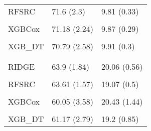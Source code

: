 \begin{longtable}[t]{lll}
\hspace{1em}RFSRC & 71.6 (2.3) & 9.81 (0.33)\\
\hspace{1em}\cellcolor{gray!10}{RFSRC\_DT} & \cellcolor{gray!10}{71.29 (2.13)} & \cellcolor{gray!10}{9.84 (0.28)}\\
\hspace{1em}XGBCox & 71.18 (2.24) & 9.87 (0.29)\\
\hspace{1em}\cellcolor{gray!10}{XGB\_PEM} & \cellcolor{gray!10}{71.2 (2.62)} & \cellcolor{gray!10}{9.83 (0.35)}\\
\hspace{1em}XGB\_DT & 70.79 (2.58) & 9.91 (0.3)\\
\addlinespace[0.3em]
\multicolumn{3}{l}{\textbf{tumor}}\\
\hspace{1em}\cellcolor{gray!10}{KM} & \cellcolor{gray!10}{50 (0)} & \cellcolor{gray!10}{20.06 (0.56)}\\
\hspace{1em}RIDGE & 63.9 (1.84) & 20.06 (0.56)\\
\hspace{1em}\cellcolor{gray!10}{GLMN} & \cellcolor{gray!10}{50 (0)} & \cellcolor{gray!10}{20.06 (0.56)}\\
\hspace{1em}RFSRC & 63.61 (1.57) & 19.07 (0.5)\\
\hspace{1em}\cellcolor{gray!10}{RFSRC\_DT} & \cellcolor{gray!10}{61.42 (1.89)} & \cellcolor{gray!10}{19.63 (0.73)}\\
\hspace{1em}XGBCox & 60.05 (3.58) & 20.43 (1.44)\\
\hspace{1em}\cellcolor{gray!10}{XGB\_PEM} & \cellcolor{gray!10}{62.33 (1.52)} & \cellcolor{gray!10}{19.16 (0.93)}\\
\hspace{1em}XGB\_DT & 61.17 (2.79) & 19.2 (0.85)\\*
\end{longtable}
